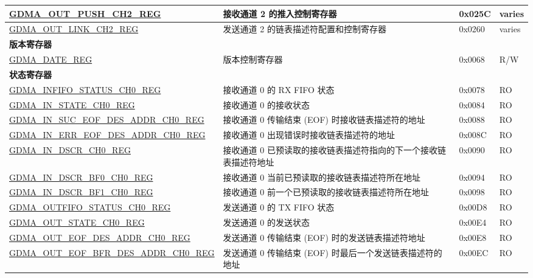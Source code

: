 \begin{longtable}{ | p{6cm} | p{7.2cm} | p{1.3cm} | p{1cm} | }
\hyperref[regdesc:GDMAOUTPUSHCHNREG]{GDMA\_OUT\_PUSH\_CH2\_REG} & 接收通道 2 的推入控制寄存器 & 0x025C & varies \\ \hline
\hyperref[regdesc:GDMAOUTLINKCHNREG]{GDMA\_OUT\_LINK\_CH2\_REG} & 发送通道 2 的链表描述符配置和控制寄存器 & 0x0260 & varies \\ \hline
\multicolumn{4}{|l|}{\textbf{版本寄存器}} \\ \hline
\hyperref[regdesc:GDMADATEREG]{GDMA\_DATE\_REG} & 版本控制寄存器 & 0x0068 & R/W \\ \hline
\multicolumn{4}{|l|}{\textbf{状态寄存器}} \\ \hline
\hyperref[regdesc:GDMAINFIFOSTATUSCHNREG]{GDMA\_INFIFO\_STATUS\_CH0\_REG} & 接收通道 0 的 RX FIFO 状态 & 0x0078 & RO \\ \hline
\hyperref[regdesc:GDMAINSTATECHNREG]{GDMA\_IN\_STATE\_CH0\_REG} & 接收通道 0 的接收状态 & 0x0084 & RO \\ \hline
\hyperref[regdesc:GDMAINSUCEOFDESADDRCHNREG]{GDMA\_IN\_SUC\_EOF\_DES\_ADDR\_CH0\newline\_REG} & 接收通道 0 传输结束 (EOF) 时接收链表描述符的地址 & 0x0088 & RO \\ \hline
\hyperref[regdesc:GDMAINERREOFDESADDRCHNREG]{GDMA\_IN\_ERR\_EOF\_DES\_ADDR\_CH0\newline\_REG} & 接收通道 0 出现错误时接收链表描述符的地址 & 0x008C & RO \\ \hline
\hyperref[regdesc:GDMAINDSCRCHNREG]{GDMA\_IN\_DSCR\_CH0\_REG} & 接收通道 0 已预读取的接收链表描述符指向的下一个接收链表描述符地址 & 0x0090 & RO \\ \hline
\hyperref[regdesc:GDMAINDSCRBF0CHNREG]{GDMA\_IN\_DSCR\_BF0\_CH0\_REG} &  接收通道 0 当前已预读取的接收链表描述符所在地址 & 0x0094 & RO \\ \hline
\hyperref[regdesc:GDMAINDSCRBF1CHNREG]{GDMA\_IN\_DSCR\_BF1\_CH0\_REG} & 接收通道 0 前一个已预读取的接收链表描述符所在地址 & 0x0098 & RO \\ \hline
\hyperref[regdesc:GDMAOUTFIFOSTATUSCHNREG]{GDMA\_OUTFIFO\_STATUS\_CH0\_REG} & 发送通道 0 的 TX FIFO 状态 & 0x00D8 & RO \\ \hline
\hyperref[regdesc:GDMAOUTSTATECHNREG]{GDMA\_OUT\_STATE\_CH0\_REG} & 发送通道 0 的发送状态 & 0x00E4 & RO \\ \hline
\hyperref[regdesc:GDMAOUTEOFDESADDRCHNREG]{GDMA\_OUT\_EOF\_DES\_ADDR\_CH0\newline\_REG} & 发送通道 0 传输结束 (EOF) 时的发送链表描述符地址 & 0x00E8 & RO \\ \hline
\hyperref[regdesc:GDMAOUTEOFBFRDESADDRCHNREG]{GDMA\_OUT\_EOF\_BFR\_DES\_ADDR\_CH0\newline\_REG} & 发送通道 0 传输结束 (EOF) 时最后一个发送链表描述符的地址 & 0x00EC & RO \\ \hline

\end{longtable}
